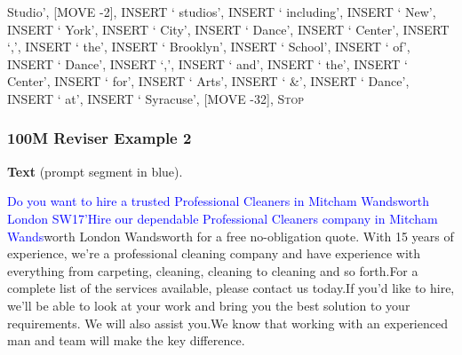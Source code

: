 \documentclass[11pt]{article}
\DeclareRobustCommand{\Stop}{\ifmmode\text{\textsc{Stop}}\else\textsc{Stop}\fi}
\begin{document}
{Studio', [MOVE -2], INSERT ` studios', INSERT ` including', INSERT ` New', INSERT ` York', INSERT ` City', INSERT ` Dance', INSERT ` Center', INSERT `,', INSERT ` the', INSERT ` Brooklyn', INSERT ` School', INSERT ` of', INSERT ` Dance', INSERT `,', INSERT ` and', INSERT ` the', INSERT ` Center', INSERT ` for', INSERT ` Arts', INSERT ` \&', INSERT ` Dance', INSERT ` at', INSERT ` Syracuse', [MOVE -32], \Stop\par
}
\vspace{0.8em}
\subsubsection*{100M Reviser Example 2}
\textbf{Text} (prompt segment in blue).\par
\ttfamily\small \textcolor{blue}{Do you want to hire a trusted Professional Cleaners in Mitcham Wandsworth London SW17'\newline Hire our dependable Professional Cleaners company in Mitcham Wands}worth London Wandsworth for a free no-obligation quote. With 15 years of experience, we’re a professional cleaning company and have experience with everything from carpeting, cleaning, cleaning to cleaning and so forth.\newline For a complete list of the services available, please contact us today.\newline If you’d like to hire, we’ll be able to look at your work and bring you the best solution to your requirements. We will also assist you.\newline We know that working with an experienced man and team will make the key difference.
\end{document}
